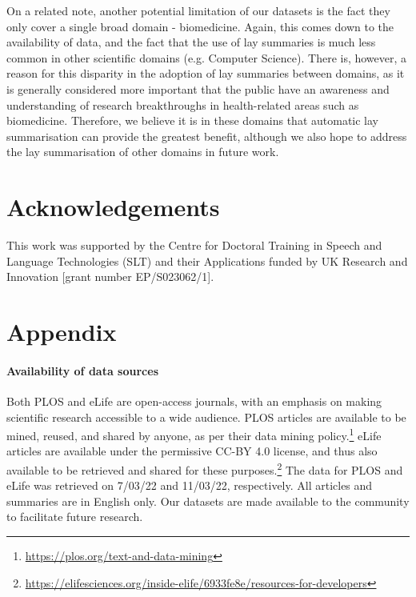 \documentclass[11pt]{article}
\begin{document}
On a related note, another potential limitation of our datasets is the fact they only cover a single broad domain - biomedicine. Again, this comes down to the availability of data, and the fact that the use of lay summaries is much less common in other scientific domains (e.g. Computer Science).
There is, however, a reason for this disparity in the adoption of lay summaries between domains, as it is generally considered more important that the public have an awareness and understanding of research breakthroughs in health-related areas such as biomedicine.
Therefore, we believe it is in these domains that automatic lay summarisation can provide the greatest benefit, although we also hope to address the lay summarisation of other domains in future work.












%
 \section{Acknowledgements}

This work was supported by the Centre for Doctoral Training in Speech and Language Technologies (SLT) and their Applications funded by UK Research and Innovation [grant number EP/S023062/1]. 




\appendix
\section{Appendix} \label{sec:appendix1}

\paragraph{Availability of data sources}
Both PLOS and eLife are open-access journals, with an emphasis on making scientific research accessible to a wide audience. PLOS articles are available to be mined, reused, and shared by anyone, as per their data mining policy.\footnote{\url{https://plos.org/text-and-data-mining}} eLife articles are available under the permissive CC-BY 4.0 license, and thus also available to be retrieved and shared for these purposes.\footnote{\url{https://elifesciences.org/inside-elife/6933fe8e/resources-for-developers}} The data for PLOS and eLife was retrieved on 7/03/22 and 11/03/22, respectively. All articles and summaries are in English only. Our datasets are made available to the community to facilitate future research.
\end{document}
